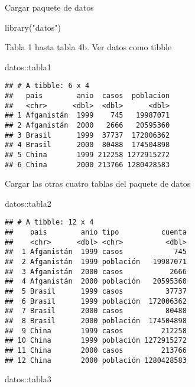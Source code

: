 \documentclass[
]{article}
\newenvironment{Shaded}{\begin{snugshade}}{\end{snugshade}}
\newcommand{\FunctionTok}[1]{\textcolor[rgb]{0.00,0.00,0.00}{#1}}
\newcommand{\NormalTok}[1]{#1}
\newcommand{\SpecialCharTok}[1]{\textcolor[rgb]{0.00,0.00,0.00}{#1}}
\newcommand{\StringTok}[1]{\textcolor[rgb]{0.31,0.60,0.02}{#1}}
\begin{document}
Cargar paquete de datos

\begin{Shaded}
\begin{Highlighting}[]
\FunctionTok{library}\NormalTok{(}\StringTok{"datos"}\NormalTok{)}
\end{Highlighting}
\end{Shaded}

Tabla 1 hasta tabla 4b. Ver datos como tibble

\begin{Shaded}
\begin{Highlighting}[]
\NormalTok{datos}\SpecialCharTok{::}\NormalTok{tabla1}
\end{Highlighting}
\end{Shaded}

\begin{verbatim}
## # A tibble: 6 x 4
##   pais        anio  casos  poblacion
##   <chr>      <dbl>  <dbl>      <dbl>
## 1 Afganistán  1999    745   19987071
## 2 Afganistán  2000   2666   20595360
## 3 Brasil      1999  37737  172006362
## 4 Brasil      2000  80488  174504898
## 5 China       1999 212258 1272915272
## 6 China       2000 213766 1280428583
\end{verbatim}

Cargar las otras cuatro tablas del paquete de datos

\begin{Shaded}
\begin{Highlighting}[]
\NormalTok{datos}\SpecialCharTok{::}\NormalTok{tabla2}
\end{Highlighting}
\end{Shaded}

\begin{verbatim}
## # A tibble: 12 x 4
##    pais        anio tipo          cuenta
##    <chr>      <dbl> <chr>          <dbl>
##  1 Afganistán  1999 casos            745
##  2 Afganistán  1999 población   19987071
##  3 Afganistán  2000 casos           2666
##  4 Afganistán  2000 población   20595360
##  5 Brasil      1999 casos          37737
##  6 Brasil      1999 población  172006362
##  7 Brasil      2000 casos          80488
##  8 Brasil      2000 población  174504898
##  9 China       1999 casos         212258
## 10 China       1999 población 1272915272
## 11 China       2000 casos         213766
## 12 China       2000 población 1280428583
\end{verbatim}

\begin{Shaded}
\begin{Highlighting}[]
\NormalTok{datos}\SpecialCharTok{::}\NormalTok{tabla3}
\end{Highlighting}
\end{Shaded}
\end{document}
